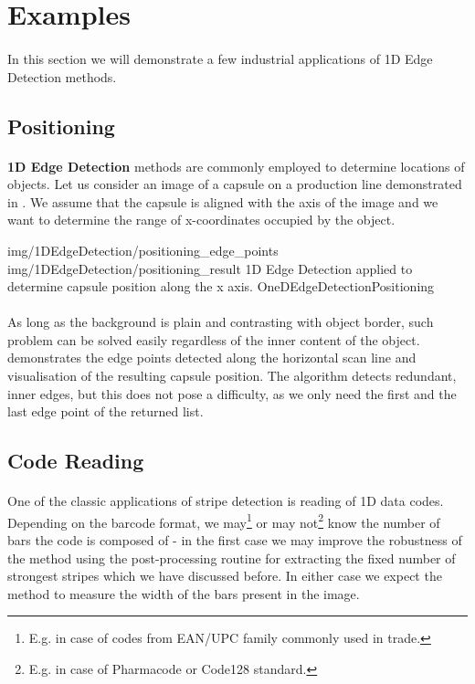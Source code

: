 \section{Examples}

\paragraph*{}
In this section we will demonstrate a few industrial applications of 1D Edge Detection methods.

\subsection{Positioning}

\paragraph*{}
\textbf{1D Edge Detection} methods are commonly employed to determine locations of objects. Let us consider an image of a capsule on a production line demonstrated in . We assume that the capsule is aligned with the axis of the image and we want to determine the range of x-coordinates occupied by the object.

\twoFigures
{img/1DEdgeDetection/positioning_edge_points}
{img/1DEdgeDetection/positioning_result}
{1D Edge Detection applied to determine capsule position along the x axis.}
{OneDEdgeDetectionPositioning}
{\basicWidth}

\paragraph*{}
As long as the background is plain and contrasting with object border, such problem can be solved easily regardless of the inner content of the object.  demonstrates the edge points detected along the horizontal scan line and visualisation of the resulting capsule position. The algorithm detects redundant, inner edges, but this does not pose a difficulty, as we only need the first and the last edge point of the returned list.

\subsection{Code Reading}

\paragraph*{}
One of the classic applications of stripe detection is reading of 1D data codes. Depending on the barcode format, we may\footnote{E.g. in case of codes from EAN/UPC family commonly used in trade.} or may not\footnote{E.g. in case of Pharmacode or Code128 standard.} know the number of bars the code is composed of - in the first case we may improve the robustness of the method using the post-processing routine for extracting the fixed number of strongest stripes which we have discussed before. In either case we expect the method to measure the width of the bars present in the image.


